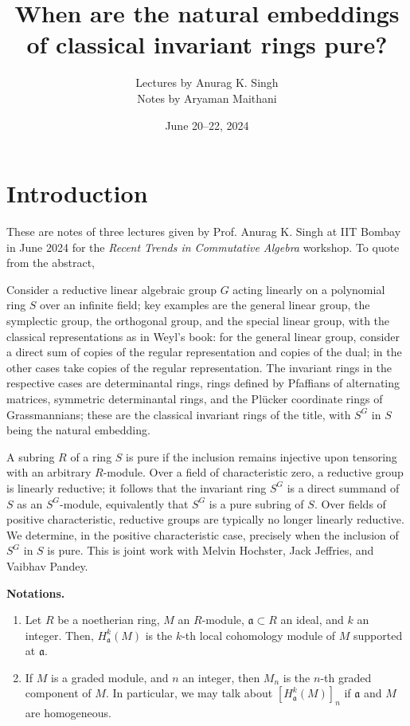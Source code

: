 \documentclass[12pt]{article}
\title{When are the natural embeddings of classical invariant rings pure?}
\author{Lectures by Anurag K. Singh \\ {\small Notes by Aryaman Maithani}}
\date{June 20--22, 2024}
\begin{document}
\maketitle

\section{Introduction}

These are notes of three lectures given by Prof. Anurag K. Singh at IIT Bombay in June 2024 for the \emph{Recent Trends in Commutative Algebra} workshop. To quote from the abstract, \newline

\begin{blockquote}
	Consider a reductive linear algebraic group $G$ acting linearly on a polynomial ring $S$ over an infinite field; key examples are the general linear group, the symplectic group, the orthogonal group, and the special linear group, with the classical representations as in Weyl's book: for the general linear group, consider a direct sum of copies of the regular representation and copies of the dual; in the other cases take copies of the regular representation.  The invariant rings in the respective cases are determinantal rings, rings defined by Pfaffians of alternating matrices, symmetric determinantal rings, and the Pl\"{u}cker coordinate rings of Grassmannians; these are the classical invariant rings of the title, with $S^{G}$ in $S$ being the natural embedding.

	A subring $R$ of a ring $S$ is pure if the inclusion remains injective upon tensoring with an arbitrary $R$-module.  Over a field of characteristic zero, a reductive group is linearly reductive; it follows that the invariant ring $S^{G}$ is a direct summand of $S$ as an $S^{G}$-module, equivalently that $S^{G}$ is a pure subring of $S$.  Over fields of positive characteristic, reductive groups are typically no longer linearly reductive.  We determine, in the positive characteristic case, precisely when the inclusion of $S^{G}$ in $S$ is pure.  This is joint work with Melvin Hochster, Jack Jeffries, and Vaibhav Pandey.
\end{blockquote}

\textbf{Notations.}
\begin{enumerate}[label=(\alph*)]
	\item Let $R$ be a noetherian ring, $M$ an $R$-module, $\mathfrak{a} \subset R$ an ideal, and $k$ an integer. Then, $H_{\mathfrak{a}}^{k}(M)$ is the $k$-th local cohomology module of $M$ supported at $\mathfrak{a}$. 
	\item If $M$ is a graded module, and $n$ an integer, then $M_{n}$ is the $n$-th graded component of $M$. In particular, we may talk about $\left[H_{\mathfrak{a}}^{k}(M)\right]_{n}$ if $\mathfrak{a}$ and $M$ are homogeneous.
\end{enumerate}
\end{document}

